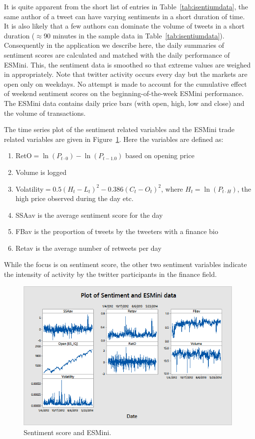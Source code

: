 It is quite apparent from the short list of entries in Table~\ref{tab:isentiumdata}, the same author of a tweet can have varying sentiments in a short duration of time. It is also likely that a few authors can dominate the volume of tweets in a short duration ($\approx$90 minutes in the sample data in Table~\ref{tab:isentiumdata}). Consequently in the application we describe here, the daily summaries of sentiment scores are calculated and matched with the daily performance of ESMini. This, the sentiment data is smoothed so that extreme values are weighed in appropriately. Note that twitter activity occurs every day but the markets are open only on weekdays. No attempt is made to account for the cumulative effect of weekend sentiment scores on the beginning-of-the-week ESMini performance. The ESMini data contains daily price bars (with open, high, low and close) and the volume of transactions.


The time series plot of the sentiment related variables and the ESMini trade related variables are given in Figure~\ref{fig:sentimentesmini}. Here the variables are defined as:
        \begin{enumerate}[--]
        \item RetO$=\ln(P_{t \cdot 0}) - \ln(P_{t-1.0})$ based on opening price
        \item Volume is logged
        \item Volatility$= 0.5(H_t-L_t)^2 - 0.386(C_t-O_t)^2$, where $H_t=\ln(P_{t \cdot H})$, the high price observed during the day etc.
        \item SSAav is the average sentiment score for the day
        \item FBav is the proportion of tweets by the tweeters with a finance bio
        \item Retav is the average number of retweets per day 
        \end{enumerate}
While the focus is on sentiment score, the other two sentiment variables indicate the intensity of activity by the twitter participants in the finance field. 

	\begin{figure}[!ht]
	\centering
	\includegraphics[width=\textwidth]{chapters/chapter_news_an/figures/ch4sec4sentimentesmini} 
	\caption{Sentiment score and ESMini. \label{fig:sentimentesmini}}
	\end{figure}


